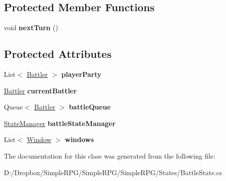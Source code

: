 \subsection*{Protected Member Functions}
\begin{DoxyCompactItemize}
\item 
\hypertarget{class_simple_r_p_g_1_1_states_1_1_battle_state_a66068004749422203c514634de5c95a6}{void {\bfseries next\+Turn} ()}\label{class_simple_r_p_g_1_1_states_1_1_battle_state_a66068004749422203c514634de5c95a6}

\end{DoxyCompactItemize}
\subsection*{Protected Attributes}
\begin{DoxyCompactItemize}
\item 
\hypertarget{class_simple_r_p_g_1_1_states_1_1_battle_state_a8ee2e240ea8fef49273421e887c2a5b1}{List$<$ \hyperlink{class_simple_r_p_g_1_1_battler}{Battler} $>$ {\bfseries player\+Party}}\label{class_simple_r_p_g_1_1_states_1_1_battle_state_a8ee2e240ea8fef49273421e887c2a5b1}

\item 
\hypertarget{class_simple_r_p_g_1_1_states_1_1_battle_state_a0810fb7d1b97d2e8f18f02e4ec90708e}{\hyperlink{class_simple_r_p_g_1_1_battler}{Battler} {\bfseries current\+Battler}}\label{class_simple_r_p_g_1_1_states_1_1_battle_state_a0810fb7d1b97d2e8f18f02e4ec90708e}

\item 
\hypertarget{class_simple_r_p_g_1_1_states_1_1_battle_state_a322abc88cfc8f9911b39ba2d0954189b}{Queue$<$ \hyperlink{class_simple_r_p_g_1_1_battler}{Battler} $>$ {\bfseries battle\+Queue}}\label{class_simple_r_p_g_1_1_states_1_1_battle_state_a322abc88cfc8f9911b39ba2d0954189b}

\item 
\hypertarget{class_simple_r_p_g_1_1_states_1_1_battle_state_a2220bb7da4a4a23bb41b7affb6bf045c}{\hyperlink{class_simple_r_p_g_1_1_states_1_1_state_manager}{State\+Manager} {\bfseries battle\+State\+Manager}}\label{class_simple_r_p_g_1_1_states_1_1_battle_state_a2220bb7da4a4a23bb41b7affb6bf045c}

\item 
\hypertarget{class_simple_r_p_g_1_1_states_1_1_battle_state_a851189a4c36d8f38c2c36882b64c3d8b}{List$<$ \hyperlink{class_simple_r_p_g_1_1_windows_1_1_window}{Window} $>$ {\bfseries windows}}\label{class_simple_r_p_g_1_1_states_1_1_battle_state_a851189a4c36d8f38c2c36882b64c3d8b}

\end{DoxyCompactItemize}


The documentation for this class was generated from the following file\+:\begin{DoxyCompactItemize}
\item 
D\+:/\+Dropbox/\+Simple\+R\+P\+G/\+Simple\+R\+P\+G/\+Simple\+R\+P\+G/\+States/Battle\+State.\+cs\end{DoxyCompactItemize}
